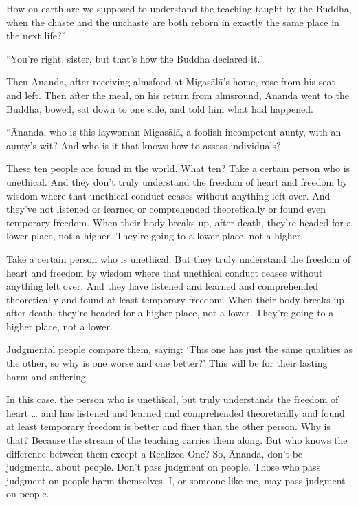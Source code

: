 \documentclass[12pt,openany]{book}%
\begin{document}
How on earth are we supposed to understand the teaching taught by the Buddha, when the chaste and the unchaste are both reborn in exactly the same place in the next life?” 

“You’re right, sister, but that’s how the Buddha declared it.” 

Then Ānanda, after receiving almsfood at \textsanskrit{Migasālā}’s home, rose from his seat and left. Then after the meal, on his return from almsround, Ānanda went to the Buddha, bowed, sat down to one side, and told him what had happened. 

“Ānanda, who is this laywoman \textsanskrit{Migasālā}, a foolish incompetent aunty, with an aunty’s wit? And who is it that knows how to assess individuals? 

These ten people are found in the world. What ten? Take a certain person who is unethical. And they don’t truly understand the freedom of heart and freedom by wisdom where that unethical conduct ceases without anything left over. And they’ve not listened or learned or comprehended theoretically or found even temporary freedom. When their body breaks up, after death, they’re headed for a lower place, not a higher. They’re going to a lower place, not a higher. 

Take a certain person who is unethical. But they truly understand the freedom of heart and freedom by wisdom where that unethical conduct ceases without anything left over. And they have listened and learned and comprehended theoretically and found at least temporary freedom. When their body breaks up, after death, they’re headed for a higher place, not a lower. They’re going to a higher place, not a lower. 

Judgmental people compare them, saying: ‘This one has just the same qualities as the other, so why is one worse and one better?’ This will be for their lasting harm and suffering. 

In this case, the person who is unethical, but truly understands the freedom of heart … and has listened and learned and comprehended theoretically and found at least temporary freedom is better and finer than the other person. Why is that? Because the stream of the teaching carries them along. But who knows the difference between them except a Realized One? So, Ānanda, don’t be judgmental about people. Don’t pass judgment on people. Those who pass judgment on people harm themselves. I, or someone like me, may pass judgment on people. 
\end{document}
